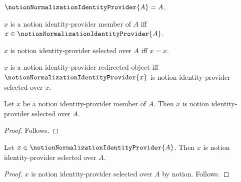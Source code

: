\begin{abbreviation}\label{notion_normalization_identity_provider}
    $\notionNormalizationIdentityProvider{A}=A$.
\end{abbreviation}

\begin{abbreviation}\label{notion_normalization_identity_member}
    $x$ is a notion identity-provider member of $A$ iff
        $x\in\notionNormalizationIdentityProvider{A}$.
\end{abbreviation}

\begin{definition}\label{notion_normalization_identity_selected}
    $x$ is notion identity-provider selected over $A$ iff $x=x$.
\end{definition}

\begin{abbreviation}\label{notion_normalization_identity_redirected}
    $x$ is a notion identity-provider redirected object iff
        $\notionNormalizationIdentityProvider{x}$ is
            notion identity-provider selected over $x$.
\end{abbreviation}

\begin{classification}\label{notion_normalization_identity_member_is_selected}
    Let $x$ be a notion identity-provider member of $A$.
    Then $x$ is notion identity-provider selected over $A$.
\end{classification}
\begin{proof}
    Follows.
\end{proof}

\begin{proposition}\label{notion_normalization_identity_provider_use}
    Let $x\in\notionNormalizationIdentityProvider{A}$.
    Then $x$ is notion identity-provider selected over $A$.
\end{proposition}
\begin{proof}
    $x$ is notion identity-provider selected over $A$ by notion.
    Follows.
\end{proof}
